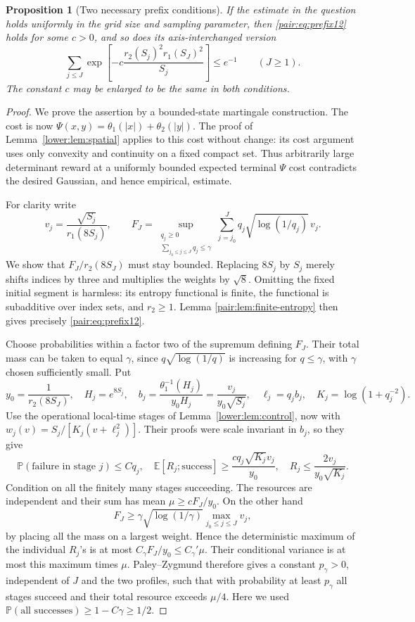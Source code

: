 \documentclass[11pt]{article}
\newtheorem{proposition}[theorem]{Proposition}
\newcommand{\E}{\mathbb E}
\newcommand{\PP}{\mathbb P}
\numberwithin{equation}{section}
\begin{document}
\begin{proposition}[Two necessary prefix conditions]
\label{pair:prop:necessary}
If the estimate in the question holds uniformly in the grid size and
sampling parameter, then \eqref{pair:eq:prefix12} holds for some
\(c>0\), and so does its axis-interchanged version
\[
 \sum_{j\le J}
 \exp\left[-c\frac{r_2(S_j)^2r_1(S_J)^2}{S_j}\right]\le e^{-1}
 \qquad(J\ge1).
 \tag{P4}\label{pair:eq:prefix21}
\]
The constant \(c\) may be enlarged to be the same in both conditions.
\end{proposition}
\begin{proof}
We prove the assertion by a bounded-state martingale construction.
The cost is now
\(\Psi(x,y)=\theta_1(|x|)+\theta_2(|y|)\).
The proof of Lemma~\ref{lower:lem:spatial} applies to this cost without
change: its cost argument uses only convexity and continuity on a
fixed compact set.  Thus arbitrarily large determinant reward at a
uniformly bounded expected terminal \(\Psi\) cost contradicts the
desired Gaussian, and hence empirical, estimate.

For clarity write
\[
 v_j=\frac{\sqrt{S_j}}{r_1(8S_j)},\qquad
 F_J=\sup_{\substack{q_j\ge0\\\sum_{j_0\le j\le J}q_j\le\gamma}}
       \sum_{j=j_0}^Jq_j\sqrt{\log(1/q_j)}\,v_j.
\]
We show that \(F_J/r_2(8S_J)\) must stay bounded.  Replacing
\(8S_j\) by \(S_j\) merely shifts indices by three and multiplies
the weights by \(\sqrt8\).  Omitting the fixed initial segment is
harmless: its entropy functional is finite, the functional is
subadditive over index sets, and \(r_2\ge1\).  Lemma
\ref{pair:lem:finite-entropy} then gives precisely
\eqref{pair:eq:prefix12}.

Choose probabilities within a factor two of the supremum defining
\(F_J\).  Their total mass can be taken to equal \(\gamma\), since
\(q\sqrt{\log(1/q)}\) is increasing for \(q\le\gamma\), with
\(\gamma\) chosen sufficiently small.  Put
\[
 y_0=\frac1{r_2(8S_J)},\quad H_j=e^{8S_j},\quad
 b_j=\frac{\theta_1^{-1}(H_j)}{y_0H_j}
     =\frac{v_j}{y_0\sqrt{S_j}},\quad
 \ell_j=q_jb_j,\quad K_j=\log(1+q_j^{-2}).
 \tag{P5}\label{pair:eq:pair-stage}
\]
Use the operational local-time stages of
Lemma~\ref{lower:lem:control}, now with
\(w_j(v)=S_j/[K_j(v+\ell_j^2)]\).  Their proofs were scale
invariant in \(b_j\), so they give
\[
 \PP(\text{failure in stage }j)\le Cq_j,\quad
 \E[R_j;\text{success}]\ge
       \frac{c q_j\sqrt{K_j}v_j}{y_0},\quad
 R_j\le\frac{2v_j}{y_0\sqrt{K_j}}.
 \tag{P6}\label{pair:eq:pair-resources}
\]
Condition on all the finitely many stages succeeding.  The resources
are independent and their sum has mean
\(\mu\ge cF_J/y_0\).  On the other hand
\[
 F_J\ge\gamma\sqrt{\log(1/\gamma)}\max_{j_0\le j\le J}v_j,
\]
by placing all the mass on a largest weight.  Hence the deterministic
maximum of the individual \(R_j\)'s is at most
\(C_\gamma F_J/y_0\le C_\gamma'\mu\).  Their conditional variance
is at most this maximum times \(\mu\).  Paley--Zygmund therefore
gives a constant \(p_\gamma>0\), independent of \(J\) and the two
profiles, such that with probability at least \(p_\gamma\) all
stages succeed and their total resource exceeds \(\mu/4\).
Here we used \(\PP(\text{all successes})\ge1-C\gamma\ge1/2\).


\end{proof}
\end{document}
